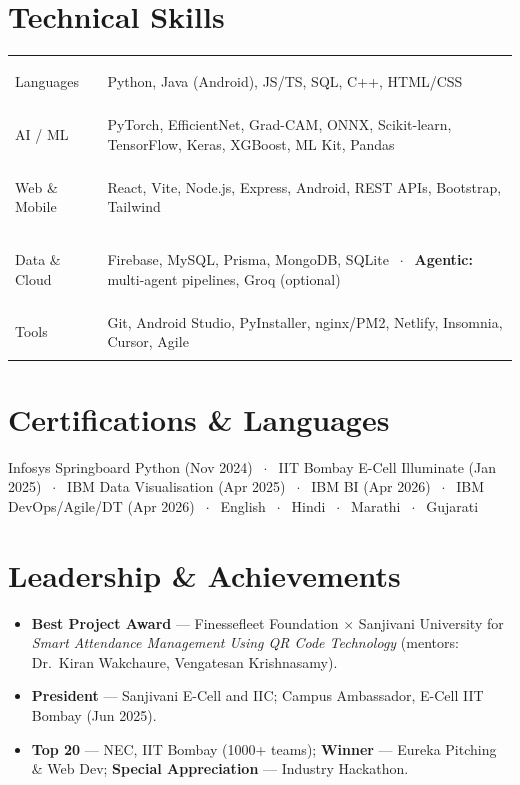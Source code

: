 \documentclass[9pt,a4paper]{extarticle}
\begin{document}
\section*{Technical Skills}
{\footnotesize
\noindent
\begin{tabularx}{\textwidth}{@{}
  >{\bfseries\raggedright\arraybackslash}p{1.05in}
  >{\raggedright\arraybackslash}X
  @{}}
Languages & Python, Java (Android), JS/TS, SQL, C++, HTML/CSS \\[0.1em]
AI / ML & PyTorch, EfficientNet, Grad-CAM, ONNX, Scikit-learn, TensorFlow, Keras, XGBoost, ML Kit, Pandas \\[0.1em]
Web \& Mobile & React, Vite, Node.js, Express, Android, REST APIs, Bootstrap, Tailwind \\[0.1em]
Data \& Cloud & Firebase, MySQL, Prisma, MongoDB, SQLite $\;\cdot\;$ \textbf{Agentic:} multi-agent pipelines, Groq (optional) \\[0.1em]
Tools & Git, Android Studio, PyInstaller, nginx/PM2, Netlify, Insomnia, Cursor, Agile
\end{tabularx}
}

\section*{Certifications \& Languages}
{\footnotesize Infosys Springboard Python (Nov 2024) $\;\cdot\;$ IIT Bombay E-Cell Illuminate (Jan 2025) $\;\cdot\;$ IBM Data Visualisation (Apr 2025) $\;\cdot\;$ IBM BI (Apr 2026) $\;\cdot\;$ IBM DevOps/Agile/DT (Apr 2026) $\;\cdot\;$ English $\;\cdot\;$ Hindi $\;\cdot\;$ Marathi $\;\cdot\;$ Gujarati}

\section*{Leadership \& Achievements}
\enlargethispage{8\baselineskip}
\begin{itemize}
  \item \textbf{Best Project Award} --- Finessefleet Foundation $\times$ Sanjivani University for \textit{Smart Attendance Management Using QR Code Technology} (mentors: Dr.\ Kiran Wakchaure, Vengatesan Krishnasamy).
  \item \textbf{President} --- Sanjivani E-Cell and IIC; Campus Ambassador, E-Cell IIT Bombay (Jun 2025).
  \item \textbf{Top 20} --- NEC, IIT Bombay (1000+ teams); \textbf{Winner} --- Eureka Pitching \& Web Dev; \textbf{Special Appreciation} --- Industry Hackathon.
\end{itemize}
\end{document}
